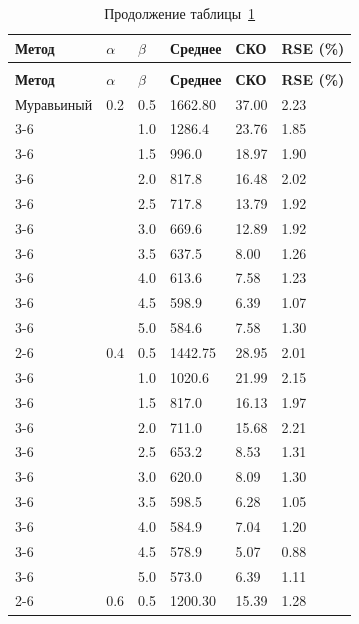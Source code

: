 \begin{longtable}{|p{}|p{}|p{}|p{}|p{}|p{}|}
	\caption{Результаты исследования устойчивости алгоритмов}\label{tbl:stability} \\
	\hline
	\textbf{Метод} & $\alpha$ & $\beta$ & \textbf{Среднее} & \textbf{СКО} & \textbf{RSE (\%)} \\
	\hline
	\endfirsthead
	
	\caption*{Продолжение таблицы~\ref{tbl:stability}} \\
	\hline
	\textbf{Метод} & $\alpha$ & $\beta$ & \textbf{Среднее} & \textbf{СКО} & \textbf{RSE (\%)} \\
	\hline
	\endhead
	\hline
	\endfoot
	\endlastfoot
	\hline
	Муравьиный & 0.2 & 0.5 & 1662.80 & 37.00 & 2.23 \\
	\cline{3-6}
	& & 1.0 & 1286.4 & 23.76 & 1.85 \\
	\cline{3-6}
	& & 1.5 & 996.0 & 18.97 & 1.90 \\
	\cline{3-6}
	& & 2.0 & 817.8 & 16.48 & 2.02 \\
	\cline{3-6}
	& & 2.5 & 717.8 & 13.79 & 1.92 \\
	\cline{3-6}
	& & 3.0 & 669.6 & 12.89 & 1.92 \\
	\cline{3-6}
	& & 3.5 & 637.5 & 8.00 & 1.26 \\
	\cline{3-6}
	& & 4.0 & 613.6 & 7.58 & 1.23 \\
	\cline{3-6}
	& & 4.5 & 598.9 & 6.39 & 1.07 \\
	\cline{3-6}
	& & 5.0 & 584.6 & 7.58 & 1.30 \\
	\cline{2-6}
	& 0.4 & 0.5 & 1442.75 & 28.95 & 2.01 \\
	\cline{3-6}
	& & 1.0 & 1020.6 & 21.99 & 2.15 \\
	\cline{3-6}
	& & 1.5 & 817.0 & 16.13 & 1.97 \\
	\cline{3-6}
	& & 2.0 & 711.0 & 15.68 & 2.21 \\
	\cline{3-6}
	& & 2.5 & 653.2 & 8.53 & 1.31 \\
	\cline{3-6}
	& & 3.0 & 620.0 & 8.09 & 1.30 \\
	\cline{3-6}
	& & 3.5 & 598.5 & 6.28 & 1.05 \\
	\cline{3-6}
	& & 4.0 & 584.9 & 7.04 & 1.20 \\
	\cline{3-6}
	& & 4.5 & 578.9 & 5.07 & 0.88 \\
	\cline{3-6}
	& & 5.0 & 573.0 & 6.39 & 1.11 \\
	\cline{2-6}
	& 0.6 & 0.5 & 1200.30 & 15.39 & 1.28 \\

\end{longtable}
